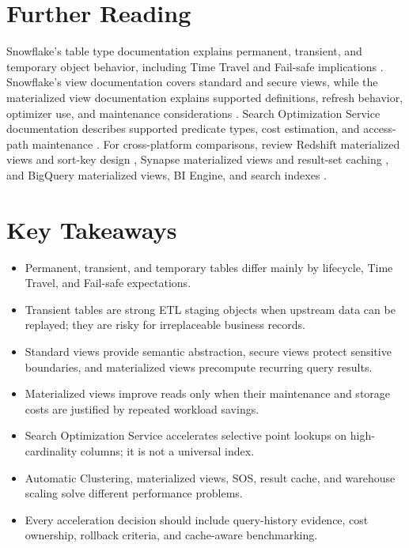 \section{Further Reading}
Snowflake's table type documentation explains permanent, transient, and temporary object behavior, including Time Travel and Fail-safe implications \cite{snowflakeTableTypesDocs}. Snowflake's view documentation covers standard and secure views, while the materialized view documentation explains supported definitions, refresh behavior, optimizer use, and maintenance considerations \cite{snowflakeViewsDocs,snowflakeSecureViewsDocs,snowflakeMaterializedViewsDocs}. Search Optimization Service documentation describes supported predicate types, cost estimation, and access-path maintenance \cite{snowflakeSearchOptimizationDocs}. For cross-platform comparisons, review Redshift materialized views and sort-key design \cite{awsRedshiftMaterializedViewsDocs,awsRedshiftSortKeysDocs}, Synapse materialized views and result-set caching \cite{azureSynapseMaterializedViewsDocs,azureSynapseResultSetCachingDocs}, and BigQuery materialized views, BI Engine, and search indexes \cite{googleBigQueryMaterializedViewsDocs,googleBigQueryBIEngineDocs,googleBigQuerySearchIndexesDocs}.
\section*{Key Takeaways}
\begin{itemize}
    \item Permanent, transient, and temporary tables differ mainly by lifecycle, Time Travel, and Fail-safe expectations.
    \item Transient tables are strong ETL staging objects when upstream data can be replayed; they are risky for irreplaceable business records.
    \item Standard views provide semantic abstraction, secure views protect sensitive boundaries, and materialized views precompute recurring query results.
    \item Materialized views improve reads only when their maintenance and storage costs are justified by repeated workload savings.
    \item Search Optimization Service accelerates selective point lookups on high-cardinality columns; it is not a universal index.
    \item Automatic Clustering, materialized views, SOS, result cache, and warehouse scaling solve different performance problems.
    \item Every acceleration decision should include query-history evidence, cost ownership, rollback criteria, and cache-aware benchmarking.
\end{itemize}
